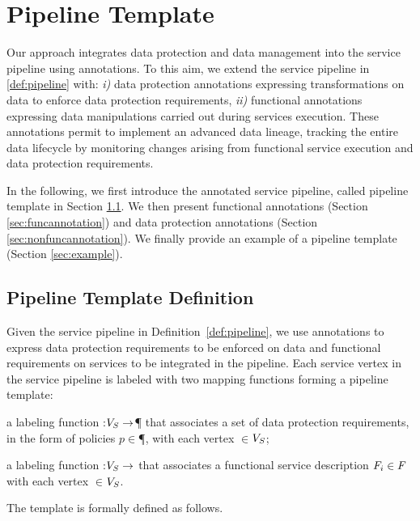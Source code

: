 \section{Pipeline Template}\label{sec:template}
Our approach integrates data protection and data management into the service pipeline using annotations.
To this aim, we extend the service pipeline in \cref{def:pipeline} with: \emph{i)} data protection annotations expressing transformations on data to enforce data protection requirements, \emph{ii)} functional annotations expressing data manipulations carried out during services execution.
These annotations permit to implement an advanced data lineage, tracking the entire data lifecycle by monitoring changes arising from functional service execution and data protection requirements.

In the following, we first introduce the annotated service pipeline, called pipeline template in Section \ref{sec:templatedefinition}. We then present functional annotations (Section \ref{sec:funcannotation}) and data protection annotations (Section \ref{sec:nonfuncannotation}). We finally provide an example of a pipeline template (Section \ref{sec:example}).


\subsection{Pipeline Template Definition}\label{sec:templatedefinition}
Given the service pipeline in Definition~\ref{def:pipeline}, we use annotations to express data protection requirements to be enforced on data and functional requirements on services to be integrated in the pipeline. Each service vertex in the service pipeline is labeled with two mapping functions forming a pipeline template:
\begin{enumerate*}[label=\roman*)]
  \item a labeling function \myLambda:$V_S\rightarrow$\P{} that associates a set of data protection requirements, in the form of policies $p$$\in$\P{}, with each vertex $\in$$V_S$;
  \item a labeling function \myGamma:$V_S\rightarrow$\F{} that associates a functional service description $F_i\in F_{}$ with each vertex $\in$$V_S$.
\end{enumerate*}

The template is formally defined as follows.

